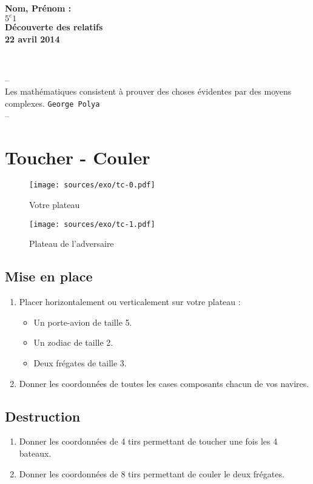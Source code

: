 \documentclass[11pt]{article}
\begin{document}

\begin{minipage}[t]{\textwidth}
\raggedright
{\bfseries Nom, Prénom : \underline{\phantom{123456789123456789}}}\\
{\bfseries $5^{e}1$}\\[.35ex]
\vspace*{-1cm}
\raggedleft
{\bfseries Découverte des relatifs}\\[.35ex]
{\bfseries 22 avril 2014}\\[.35ex]
\end{minipage}\\[1em]

\begin{center}
  \textsf{--}\\
  \textsf{Les mathématiques consistent à prouver des choses évidentes par des moyens complexes.}
  \texttt{George Polya}\\
  \textsf{--}
\end{center}

\section{Toucher - Couler}

\setlength{\columnseprule}{1pt}
\begin{multicols}{2}
\begin{figure}[H]
  \centering
  \texttt{[image: sources/exo/tc-0.pdf]}
  \caption{Votre plateau}
\end{figure}

\begin{figure}[H]
  \centering
  \texttt{[image: sources/exo/tc-1.pdf]}
  \caption{Plateau de l'adversaire}
\end{figure}
\end{multicols}  

\subsection{Mise en place}
\begin{enumerate}
\item Placer horizontalement ou verticalement sur votre plateau  :
\begin{itemize}
\item Un porte-avion de taille 5.
\item Un zodiac de taille 2.
\item Deux frégates de taille 3.
\end{itemize}

\item Donner les coordonnées de toutes les cases composants chacun de vos navires.
\end{enumerate}

\subsection{Destruction}
\begin{enumerate}
\item Donner les coordonnées de 4 tirs permettant de toucher une fois les 4 bateaux.
\item Donner les coordonnées de 8 tirs permettant de couler le deux frégates.
\end{enumerate}
\end{document}
